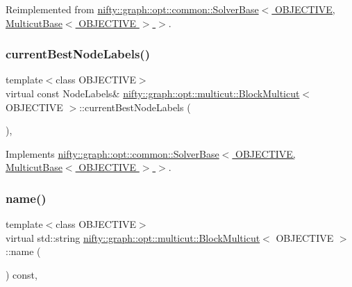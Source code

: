 Reimplemented from \hyperlink{classnifty_1_1graph_1_1opt_1_1common_1_1SolverBase_a871de6574e6189a0c97c0b2121b07155}{nifty\+::graph\+::opt\+::common\+::\+Solver\+Base$<$ O\+B\+J\+E\+C\+T\+I\+V\+E, Multicut\+Base$<$ O\+B\+J\+E\+C\+T\+I\+V\+E $>$ $>$}.

\mbox{\label{classnifty_1_1graph_1_1opt_1_1multicut_1_1BlockMulticut_ae09c0ea657df934d97b7b192c82851f8}} 
\subsubsection{\texorpdfstring{current\+Best\+Node\+Labels()}{currentBestNodeLabels()}}
{\footnotesize\ttfamily template$<$class O\+B\+J\+E\+C\+T\+I\+VE$>$ \\
virtual const Node\+Labels\& \hyperlink{classnifty_1_1graph_1_1opt_1_1multicut_1_1BlockMulticut}{nifty\+::graph\+::opt\+::multicut\+::\+Block\+Multicut}$<$ O\+B\+J\+E\+C\+T\+I\+VE $>$\+::current\+Best\+Node\+Labels (\begin{DoxyParamCaption}{ }\end{DoxyParamCaption})\hspace{0.3cm}{\ttfamily [inline]}, {\ttfamily [virtual]}}



Implements \hyperlink{classnifty_1_1graph_1_1opt_1_1common_1_1SolverBase_a7bbe01ee201cf3157b251e54c5ff0619}{nifty\+::graph\+::opt\+::common\+::\+Solver\+Base$<$ O\+B\+J\+E\+C\+T\+I\+V\+E, Multicut\+Base$<$ O\+B\+J\+E\+C\+T\+I\+V\+E $>$ $>$}.

\mbox{\label{classnifty_1_1graph_1_1opt_1_1multicut_1_1BlockMulticut_aeac464d816f0b839bbbfcf9ab4238d06}} 
\subsubsection{\texorpdfstring{name()}{name()}}
{\footnotesize\ttfamily template$<$class O\+B\+J\+E\+C\+T\+I\+VE$>$ \\
virtual std\+::string \hyperlink{classnifty_1_1graph_1_1opt_1_1multicut_1_1BlockMulticut}{nifty\+::graph\+::opt\+::multicut\+::\+Block\+Multicut}$<$ O\+B\+J\+E\+C\+T\+I\+VE $>$\+::name (\begin{DoxyParamCaption}{ }\end{DoxyParamCaption}) const\hspace{0.3cm}{\ttfamily [inline]}, {\ttfamily [virtual]}}



